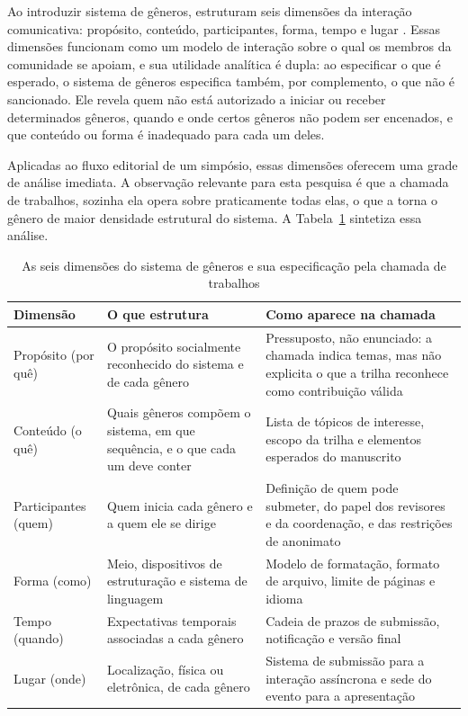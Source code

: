 Ao introduzir sistema de gêneros, \cite{GenreSystems} estruturam seis dimensões da interação comunicativa: propósito, conteúdo, participantes, forma, tempo e lugar . Essas dimensões funcionam como um modelo de interação sobre o qual os membros da comunidade se apoiam, e sua utilidade analítica é dupla: ao especificar o que é esperado, o sistema de gêneros especifica também, por complemento, o que não é sancionado. Ele revela quem não está autorizado a iniciar ou receber determinados gêneros, quando e onde certos gêneros não podem ser encenados, e que conteúdo ou forma é inadequado para cada um deles.
 
Aplicadas ao fluxo editorial de um simpósio, essas dimensões oferecem uma grade de análise imediata. A observação relevante para esta pesquisa é que a chamada de trabalhos, sozinha ela opera sobre praticamente todas elas, o que a torna o gênero de maior densidade estrutural do sistema. A Tabela~\ref{tab:dimensoes-cfp} sintetiza essa análise.
 
\begin{table}[H]
\centering
\caption{As seis dimensões do sistema de gêneros e sua especificação pela chamada de trabalhos}
\label{tab:dimensoes-cfp}
\footnotesize
\begin{tabular}{|p{2.6cm}|p{4.5cm}|p{6.0cm}|}
\hline
\textbf{Dimensão} & \textbf{O que estrutura} & \textbf{Como aparece na chamada} \\
\hline
Propósito (por quê) & O propósito socialmente reconhecido do sistema e de cada gênero & Pressuposto, não enunciado: a chamada indica temas, mas não explicita o que a trilha reconhece como contribuição válida \\
Conteúdo (o quê) & Quais gêneros compõem o sistema, em que sequência, e o que cada um deve conter & Lista de tópicos de interesse, escopo da trilha e elementos esperados do manuscrito \\
Participantes (quem) & Quem inicia cada gênero e a quem ele se dirige & Definição de quem pode submeter, do papel dos revisores e da coordenação, e das restrições de anonimato \\
Forma (como) & Meio, dispositivos de estruturação e sistema de linguagem & Modelo de formatação, formato de arquivo, limite de páginas e idioma \\
Tempo (quando) & Expectativas temporais associadas a cada gênero & Cadeia de prazos de submissão, notificação e versão final \\
Lugar (onde) & Localização, física ou eletrônica, de cada gênero & Sistema de submissão para a interação assíncrona e sede do evento para a apresentação \\
\hline
\end{tabular}
\end{table}


